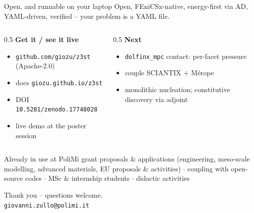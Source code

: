 \documentclass[aspectratio=169,11pt]{beamer}
\begin{document}
\begin{frame}{Open, and runnable on your laptop}
  \footnotesize
  \alert{Open, FEniCSx-native}, energy-first via AD, YAML-driven, \alert{verified} --
  your problem is a YAML file.
  \vspace{0.4em}
  \begin{columns}[T]
    \begin{column}{0.5\textwidth}
      \textbf{Get it / see it live}
      \begin{itemize}
        \item \texttt{github.com/giozu/z3st} (Apache-2.0)
        \item docs \texttt{giozu.github.io/z3st}
        \item DOI \texttt{10.5281/zenodo.17748028}
        \item \alert{live demo} at the poster session
      \end{itemize}
    \end{column}
    \begin{column}{0.5\textwidth}
      \textbf{Next}
      \begin{itemize}
        \item \texttt{dolfinx\_mpc} contact: per-facet pressure
        \item couple \alert{SCIANTIX} $+$ \alert{M\'erope}
        \item monolithic nucleation; constitutive \alert{discovery} via adjoint
      \end{itemize}
    \end{column}
  \end{columns}
  \vspace{0.45em}
  \begin{block}{Already in use at PoliMi}
    \footnotesize grant proposals \& applications (engineering, meso-scale modelling,
    advanced materials, EU proposals \& activities) $\cdot$ coupling with open-source
    codes $\cdot$ MSc \& internship students $\cdot$ didactic activities
  \end{block}
  \vspace{0.25em}
  \centering
  \alert{\large Thank you -- questions welcome.}\\[2pt]
  {\scriptsize \texttt{giovanni.zullo@polimi.it}}
\end{frame}
\end{document}
